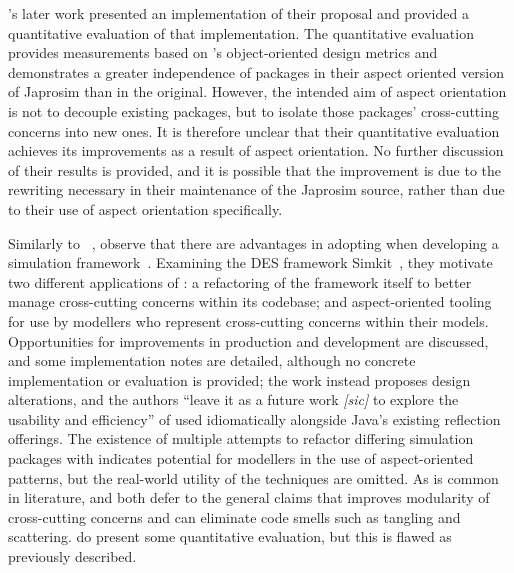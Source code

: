 \citet{chibani2019using}'s later work presented an implementation of their
proposal and provided a quantitative evaluation of that implementation. The
quantitative evaluation provides measurements based on \citet{martin1994oo}'s
object-oriented design metrics and demonstrates a greater independence of
packages in their aspect oriented version of Japrosim than in the original.
However, the intended aim of aspect orientation is not to decouple existing
packages, but to isolate those packages' cross-cutting concerns into new ones.
It is therefore unclear that their quantitative evaluation achieves its
improvements as a result of aspect orientation. No further discussion of their
results is provided, and it is possible that the improvement is due to the
rewriting necessary in their maintenance of the Japrosim source, rather than due
to their use of aspect orientation specifically.

Similarly to
\citeauthor{chibani2019using}~\cite{chibani2019using,chibani2013toward,chibani2014practical},
\citeauthor{DEVSaspectorientation2008aksu} observe that there are advantages in
adopting \aspectorientation{} when developing a simulation
framework~\cite{DEVSaspectorientation2008aksu}. Examining the DES framework
Simkit~\cite{introducing_simkit_des}, they motivate two different applications
of \aspectorientation{}: a refactoring of the framework itself to better manage
cross-cutting concerns within its codebase; and aspect-oriented tooling for use
by modellers who represent cross-cutting concerns within their models.
Opportunities for improvements in production and development are discussed, and
some implementation notes are detailed, although no concrete implementation or
evaluation is provided; the work instead proposes design alterations, and the
authors ``leave it as a future work \emph{[sic]} to explore the usability and
efficiency'' of \aspectorientation{} used idiomatically alongside Java's
existing reflection offerings. The existence of multiple attempts to refactor
differing simulation packages with \aspectorientation{} indicates potential for
modellers in the use of aspect-oriented patterns, but the real-world utility of
the techniques are omitted. As is common in \aspectorientation{} literature,
\citeauthor{chibani2019using} and \citeauthor{DEVSaspectorientation2008aksu}
both defer to the general claims that \aspectorientation{} improves modularity
of cross-cutting concerns and can eliminate code smells such as tangling and
scattering. \citeauthor{chibani2014practical} do present some
quantitative evaluation, but this is flawed as previously described.




